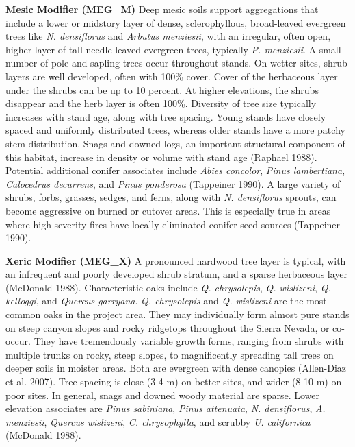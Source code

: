 \begin{adjustwidth}{2cm}{}
\textbf{Mesic Modifier (MEG\_M)}
Deep mesic soils support aggregations that include a lower or midstory layer of dense, sclerophyllous, broad-leaved evergreen trees like \emph{N. densiflorus} and \emph{Arbutus menziesii}, with an irregular, often open, higher layer of tall needle-leaved evergreen trees, typically \emph{P. menziesii}. A small number of pole and sapling trees occur throughout stands. On wetter sites, shrub layers are well developed, often with 100\% cover. Cover of the herbaceous layer under the shrubs can be up to 10 percent. At higher elevations, the shrubs disappear and the herb layer is often 100\%. Diversity of tree size typically increases with stand age, along with tree spacing. Young stands have closely spaced and uniformly distributed trees, whereas older stands have a more patchy stem distribution. Snags and downed logs, an important structural component of this habitat, increase in density or volume with stand age (Raphael 1988). Potential additional conifer associates include \emph{Abies concolor}, \emph{Pinus lambertiana}, \emph{Calocedrus decurrens}, and \emph{Pinus ponderosa} (Tappeiner 1990). A large variety of shrubs, forbs, grasses, sedges, and ferns, along with \emph{N. densiflorus} sprouts, can become aggressive on burned or cutover areas. This is especially true in areas where high severity fires have locally eliminated conifer seed sources (Tappeiner 1990).

\medskip
\noindent \textbf{Xeric Modifier (MEG\_X)}
A pronounced hardwood tree layer is typical, with an infrequent and poorly developed shrub stratum, and a sparse herbaceous layer (McDonald 1988). Characteristic oaks include \emph{Q. chrysolepis}, \emph{Q. wislizeni}, \emph{Q. kelloggi}, and \emph{Quercus garryana}. \emph{ Q. chrysolepis} and \emph{Q. wislizeni} are the most common oaks in the project area. They may individually form almost pure stands on steep canyon slopes and rocky ridgetops throughout the Sierra Nevada, or co-occur. They have tremendously variable growth forms, ranging from shrubs with multiple trunks on rocky, steep slopes, to magnificently spreading tall trees on deeper soils in moister areas. Both are evergreen with dense canopies (Allen-Diaz et al. 2007). Tree spacing is close (3-4 m) on better sites, and wider (8-10 m) on poor sites. In general, snags and downed woody material are sparse. Lower elevation associates are \emph{Pinus sabiniana}, \emph{Pinus attenuata}, \emph{N. densiflorus}, \emph{A. menziesii}, \emph{Quercus wislizeni}, \emph{C. chrysophylla}, and scrubby \emph{U. californica} (McDonald 1988).


\end{adjustwidth}
